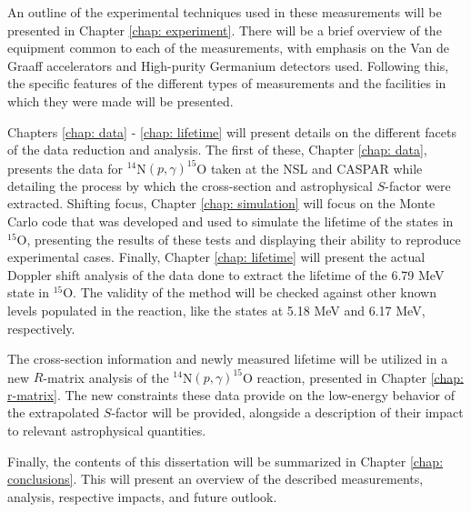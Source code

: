 An outline of the experimental techniques used in these measurements will be presented in Chapter \ref{chap: experiment}. There will be a brief overview of the equipment common to each of the measurements, with emphasis on the Van de Graaff accelerators and High-purity Germanium detectors used. Following this, the specific features of the different types of measurements and the facilities in which they were made will be presented. 

Chapters \ref{chap: data} - \ref{chap: lifetime} will present details on the different facets of the data reduction and analysis. The first of these, Chapter \ref{chap: data}, presents the data for $^{14}$N$\left( p,\gamma \right) ^{15}$O taken at the NSL and CASPAR while detailing the process by which the cross-section and astrophysical $S$-factor were extracted. Shifting focus, Chapter \ref{chap: simulation} will focus on the Monte Carlo code that was developed and used to simulate the lifetime of the states in $^{15}$O, presenting the results of these tests and displaying their ability to reproduce experimental cases. Finally, Chapter \ref{chap: lifetime} will present the actual Doppler shift analysis of the data done to extract the lifetime of the 6.79 MeV state in $^{15}$O. The validity of the method will be checked against other known levels populated in the reaction, like the states at 5.18 MeV and 6.17 MeV, respectively.

The cross-section information and newly measured lifetime will be utilized in a new $R$-matrix analysis of the $^{14}$N$\left( p,\gamma \right) ^{15}$O reaction, presented in Chapter \ref{chap: r-matrix}. The new constraints these data provide on the low-energy behavior of the extrapolated $S$-factor will be provided, alongside a description of their impact to relevant astrophysical quantities.

Finally, the contents of this dissertation will be summarized in Chapter \ref{chap: conclusions}. This will present an overview of the described measurements, analysis, respective impacts, and future outlook. 

%
% 
% 
